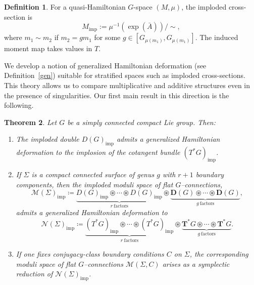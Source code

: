 \documentclass[reqno]{amsart}
\theoremstyle{plain}
\newtheorem{Thm}{Theorem}[section]
\theoremstyle{definition}
\newtheorem{Def}[Thm]{Definition}
\newcommand{\M}{\mathcal{M}}
\begin{document}
\begin{Def}\cite[Definition~3.2]{hurtubise2006group}
For a quasi-Hamiltonian $G$-space $(M,\mu)$, the imploded cross-section is
\[
M_{\mathrm{imp}}:=\mu^{-1}(\exp(\bar{A}))/\!\sim,
\]
where $m_1\sim m_2$ if $m_2=g m_1$ for some $g\in [G_{\mu(m_1)},G_{\mu(m_1)}]$. The induced moment map takes values in $T$.
\end{Def}

We develop a notion of generalized Hamiltonian deformation (see Definition~\ref{gen}) suitable for stratified spaces such as imploded cross-sections. This theory allows us to compare multiplicative and additive structures even in the presence of singularities. Our first main result in this direction is the following.

\begin{Thm}\label{Thm 1.6}
Let $G$ be a simply connected compact Lie group. Then:
\begin{enumerate}
\item The imploded double $D(G)_{\mathrm{imp}}$ admits a generalized Hamiltonian deformation to the implosion of the cotangent bundle $(T^{*}G)_{\mathrm{imp}}$.
\item If $\Sigma$ is a compact connected surface of genus $g$ with $r+1$ boundary components, then the imploded moduli space of flat $G$--connections,
\[
\mathcal{M}(\Sigma)_{\mathrm{imp}}
\coloneqq
\underbrace{D(G)_{\mathrm{imp}}\circledast\cdots\circledast D(G)_{\mathrm{imp}}}_{r\ \text{factors}}
\circledast
\underbrace{\mathbf{D}(G)\circledast\cdots\circledast \mathbf{D}(G)}_{g\ \text{factors}},
\]
admits a generalized Hamiltonian deformation to
\[
\mathcal{N}(\Sigma)_{\mathrm{imp}}
\coloneqq
\underbrace{(T^{*}G)_{\mathrm{imp}}\circledast\cdots\circledast (T^{*}G)_{\mathrm{imp}}}_{r\ \text{factors}}
\circledast
\underbrace{\mathbf{T}^{*}G\circledast\cdots\circledast \mathbf{T}^{*}G}_{g\ \text{factors}}.
\]
\item If one fixes conjugacy-class boundary conditions $C$ on $\Sigma$, the corresponding moduli space of flat $G$--connections $\M(\Sigma,C)$ arises as a symplectic reduction of $\mathcal{N}(\Sigma)_{\mathrm{imp}}$.
\end{enumerate}
\end{Thm}
\end{document}
